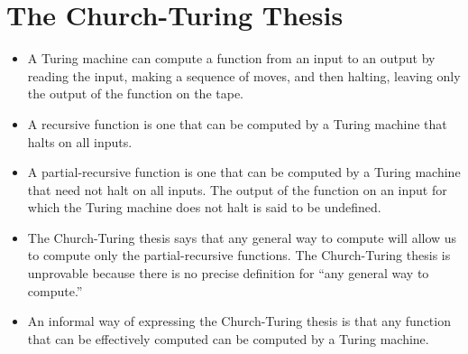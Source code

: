 \documentclass[]{article}
\begin{document}
\section{The Church-Turing Thesis}
\begin{itemize}
\item A Turing machine can compute a function from an input to an output by
reading the input, making a sequence of moves, and then halting, leaving only
the output of the function on the tape.
\item A recursive function is one that can be computed by a Turing machine that
halts on all inputs.
\item A partial-recursive function is one that can be computed by a Turing
machine that need not halt on all inputs. The output of the function on an input
for which the Turing machine does not halt is said to be undefined.
\item The Church-Turing thesis says that any general way to compute will allow
us to compute only the partial-recursive functions. The Church-Turing thesis is
unprovable because there is no precise definition for ``any general way to
compute.''
\item An informal way of expressing the Church-Turing thesis is that any
function that can be effectively computed can be computed by a Turing machine.
\end{itemize}
\end{document}
